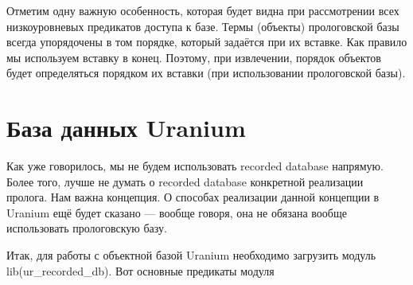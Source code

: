 \documentclass[a4paper]{book}
\def\ur{Uranium}
\begin{document}
Отметим одну важную особенность, которая будет видна при
рассмотрении всех низкоуровневых предикатов доступа к базе. Термы
(объекты) прологовской базы всегда упорядочены в том порядке,
который задаётся при их вставке. Как правило мы используем
вставку в конец. Поэтому, при извлечении, порядок объектов будет
определяться порядком их вставки (при использовании прологовской
базы).

\section{База данных \ur}

Как уже говорилось, мы не будем использовать recorded database
напрямую. Более того, лучше не думать о recorded database
конкретной реализации пролога. Нам важна концепция. О способах
реализации данной концепции в \ur{} ещё будет сказано --- вообще
говоря, она не обязана вообще использовать прологовскую базу.

Итак, для работы с объектной базой \ur{} необходимо загрузить
модуль lib(ur\_recorded\_db). Вот основные предикаты модуля
\end{document}
